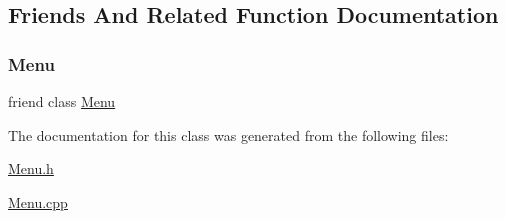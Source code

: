 \subsection{Friends And Related Function Documentation}
\mbox{\label{class_menu_item_a834cec0fab7efabab3cd53540e4d466d}} 
\subsubsection{\texorpdfstring{Menu}{Menu}}
{\footnotesize\ttfamily friend class \hyperlink{class_menu}{Menu}\hspace{0.3cm}{\ttfamily [friend]}}



The documentation for this class was generated from the following files\+:\begin{DoxyCompactItemize}
\item 
\hyperlink{_menu_8h}{Menu.\+h}\item 
\hyperlink{_menu_8cpp}{Menu.\+cpp}\end{DoxyCompactItemize}
